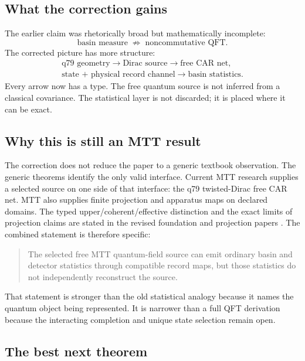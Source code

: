 \documentclass[11pt]{article}
\begin{document}
\subsection{What the correction gains}

The earlier claim was rhetorically broad but mathematically incomplete:
\[
 \text{basin measure}
 \;\not\Longrightarrow\;
 \text{noncommutative QFT}.
\]
The corrected picture has more structure:
\[
\begin{gathered}
\text{q79 geometry}
\longrightarrow
\text{Dirac source}
\longrightarrow
\text{free CAR net},\\
\text{state + physical record channel}
\longrightarrow
\text{basin statistics}.
\end{gathered}
\]
Every arrow now has a type.  The free quantum source is not inferred from a
classical covariance.  The statistical layer is not discarded; it is
placed where it can be exact.

\subsection{Why this is still an MTT result}

The correction does not reduce the paper to a generic textbook observation.
The generic theorems identify the only valid interface.  Current MTT
research supplies a selected source on one side of that interface: the
q79 twisted-Dirac free CAR net.  MTT also supplies finite projection and
apparatus maps on declared domains.  The typed upper/coherent/effective
distinction and the exact limits of projection claims are stated in the
revised foundation and projection papers
\cite{nero_foundations,nero_projection}.  The combined statement is
therefore specific:
\begin{quote}
The selected free MTT quantum-field source can emit ordinary basin and
detector statistics through compatible record maps, but those statistics do
not independently reconstruct the source.
\end{quote}

That statement is stronger than the old statistical analogy because it
names the quantum object being represented.  It is narrower than a full QFT
derivation because the interacting completion and unique state selection
remain open.

\subsection{The best next theorem}
\end{document}

